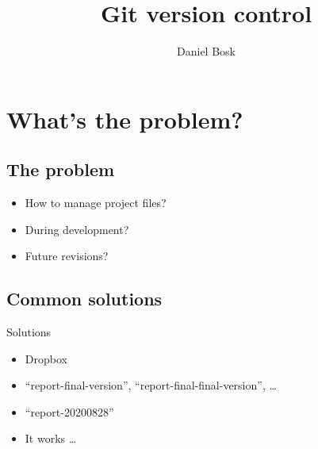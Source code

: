 \title{%
  Git version control
}
\author{Daniel Bosk}


\mode*

\begin{abstract}
  
\end{abstract}


\section{What's the problem?}

\subsection{The problem}

\begin{frame}
  \begin{question}
    \begin{itemize}
      \item How to manage project files?
      \item During development?
      \item Future revisions?
    \end{itemize}
  \end{question}
\end{frame}

\subsection{Common solutions}

\begin{frame}
  \begin{alertblock}{Solutions}
    \begin{itemize}
      \item Dropbox
      \item \enquote{report-final-version}, 
        \enquote{report-final-final-version}, \dots
      \item \enquote{report-20200828}
    \end{itemize}
  \end{alertblock}

  \pause

  \begin{remark}
    \begin{itemize}
      \item It works \dots
    \end{itemize}
  \end{remark}
\end{frame}


